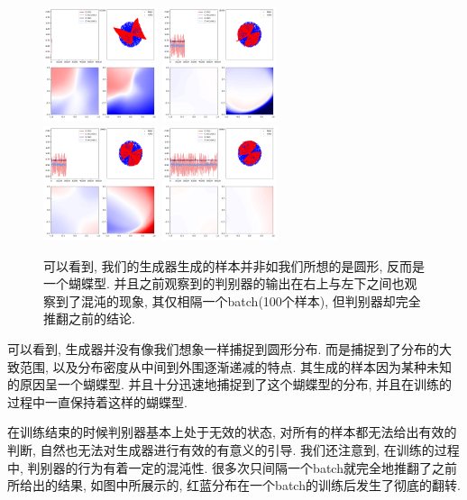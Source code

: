 \documentclass[lang=cn,11pt]{elegantpaper}
\begin{document}
\begin{figure}[htbp]
  \centering
  \includegraphics[width=0.3\textwidth]{circle_2_1}
  \includegraphics[width=0.3\textwidth]{circle_2_2}\\
  \includegraphics[width=0.3\textwidth]{circle_2_3}
  \includegraphics[width=0.3\textwidth]{circle_2_4}
  \caption{\scriptsize 可以看到, 我们的生成器生成的样本并非如我们所想的是圆形, 反而是一个蝴蝶型. 并且之前观察到的判别器的输出在右上与左下之间也观察到了混沌的现象, 其仅相隔一个batch(100个样本), 但判别器却完全推翻之前的结论.}
\end{figure}
可以看到, 生成器并没有像我们想象一样捕捉到圆形分布. 而是捕捉到了分布的大致范围, 以及分布密度从中间到外围逐渐递减的特点. 其生成的样本因为某种未知的原因呈一个蝴蝶型. 并且十分迅速地捕捉到了这个蝴蝶型的分布, 并且在训练的过程中一直保持着这样的蝴蝶型. 

在训练结束的时候判别器基本上处于无效的状态, 对所有的样本都无法给出有效的判断, 自然也无法对生成器进行有效的有意义的引导. 我们还注意到, 在训练的过程中, 判别器的行为有着一定的混沌性. 很多次只间隔一个batch就完全地推翻了之前所给出的结果, 如图中所展示的, 红蓝分布在一个batch的训练后发生了彻底的翻转. 
\end{document}
